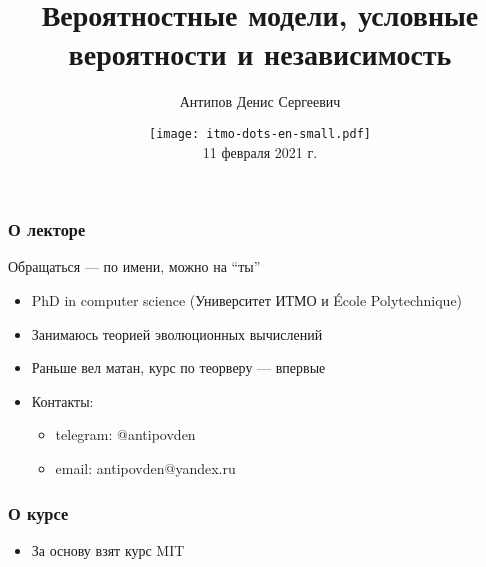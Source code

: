 \documentclass[hyperref=unicode,graphics=pdflatex,13pt,xcolor={usenames,dvipsnames}]{beamer}
\title[Вероятностные модели, условные вероятности и независимость]{Вероятностные модели, условные вероятности и независимость}
\author[Антипов Д. С.]
{Антипов Денис Сергеевич}
\institute{
Университет ИТМО, Санкт-Петербург, Россия\\
~\\
}
\date[]{\texttt{[image: itmo-dots-en-small.pdf]} \\
11 февраля 2021 г.}
\begin{document}
\begin{frame}
  \titlepage
\end{frame}


\begin{frame}
  \frametitle{О лекторе}
  Обращаться --- по имени, можно на ``ты''
  \begin{itemize}
    \item PhD in computer science (Университет ИТМО и {\'E}cole Polytechnique)
    \item Занимаюсь теорией эволюционных вычислений
    \item Раньше вел матан, курс по теорверу --- впервые
    \item Контакты:
    \begin{itemize}
      \item telegram: @antipovden
      \item email: antipovden@yandex.ru
    \end{itemize}
  \end{itemize}
\end{frame}

\begin{frame}
  \frametitle{О курсе}
  \begin{itemize}
    \item За основу взят курс MIT
  \end{itemize}
  

\end{frame}
\end{document}
